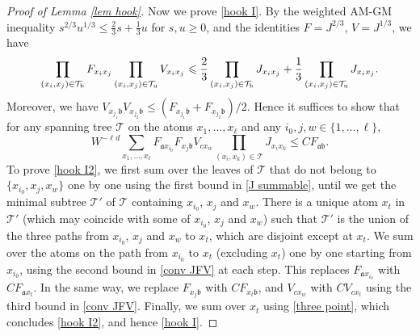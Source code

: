 \documentclass{article}
\newcommand{\1}{\mathds{1}}
\numberwithin{equation}{section}
\newcommand{\be}{\begin{equation}}
\newcommand{\ee}{\end{equation}}
\newcommand{\fa}{{\mathfrak a}}
\newcommand{\fb}{{\mathfrak b}}
\renewcommand{\cal}{\mathcal}
\renewcommand{\leq}{\leqslant}
\renewcommand{\geq}{\geqslant}
\renewcommand{\le}{\leq}
\renewcommand{\ge}{\geq}
\theoremstyle{plain} %
\theoremstyle{remark}
\begin{document}
\begin{proof}[Proof of Lemma \ref{lem hook}]
Now we prove \eqref{hook I}. By the weighted AM-GM inequality $s^{2/3}u^{1/3}\le \frac23 s+\frac13 u$ for $s,u\ge 0$, and the identities $F=J^{2/3}$, $V=J^{1/3}$, we have
\be\label{amgm}
\prod_{(x_i,x_j)\in \cal T_{\rm b}}F_{x_ix_j}\prod_{(x_i,x_j)\in \cal T_{\rm u}}V_{x_ix_j}\le \frac23\prod_{(x_i,x_j)\in \cal T_{\rm b}}J_{x_ix_j}+\frac13\prod_{(x_i,x_j)\in \cal T_{\rm u}}J_{x_ix_j}.
\ee
Moreover, we have $V_{x_{j_1}\fb}V_{x_{j_2}\fb}\le (F_{x_{j_1}\fb}+F_{x_{j_2}\fb})/2$. Hence it suffices to show that for any spanning tree $\cal T$ on the atoms $x_1,\ldots,x_\ell$ and any $i_0,j,w\in\{1,\ldots,\ell\}$,
\be\label{hook I2}
W^{-\ell d}\sum_{x_1,\ldots,x_\ell}F_{\fa x_{i_0}}F_{x_j\fb}V_{cx_w}\prod_{(x_i,x_k)\in\cal T}J_{x_ix_k}\le CF_{\fa\fb}.
\ee
To prove \eqref{hook I2}, we first sum over the leaves of $\cal T$ that do not belong to $\{x_{i_0},x_j,x_w\}$ one by one using the first bound in \eqref{J summable}, until we get the minimal subtree $\cal T'$ of $\cal T$ containing $x_{i_0}$, $x_j$ and $x_w$. There is a unique atom $x_t$ in $\cal T'$ (which may coincide with some of $x_{i_0}$, $x_j$ and $x_w$) such that $\cal T'$ is the union of the three paths from $x_{i_0}$, $x_j$ and $x_w$ to $x_t$, which are disjoint except at $x_t$. We sum over the atoms on the path from $x_{i_0}$ to $x_t$ (excluding $x_t$) one by one starting from $x_{i_0}$, using the second bound in \eqref{conv JFV} at each step. This replaces $F_{\fa x_{i_0}}$ with $CF_{\fa x_t}$. In the same way, we replace $F_{x_j\fb}$ with $CF_{x_t\fb}$, and $V_{cx_w}$ with $CV_{cx_t}$ using the third bound in \eqref{conv JFV}. Finally, we sum over $x_t$ using \eqref{three point}, which concludes \eqref{hook I2}, and hence \eqref{hook I}.
\end{proof}
\end{document}
